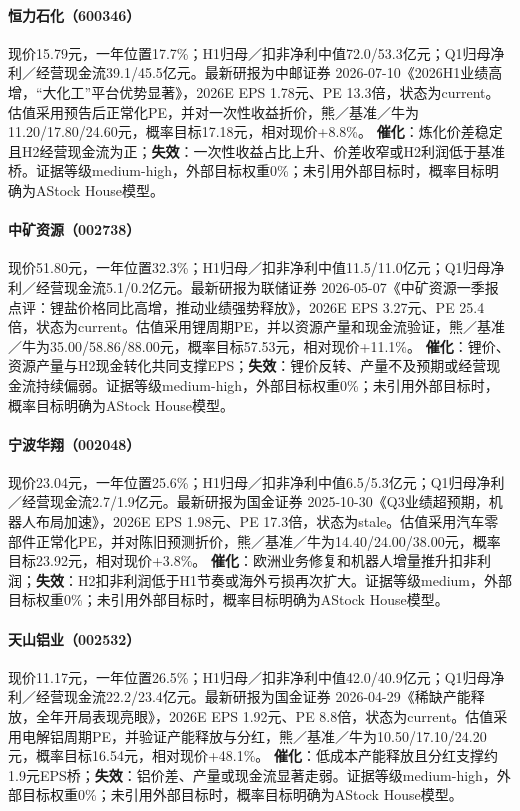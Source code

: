 \paragraph{恒力石化（600346）}
现价15.79元，一年位置17.7\%；H1归母／扣非净利中值72.0/53.3亿元；Q1归母净利／经营现金流39.1/45.5亿元。最新研报为中邮证券 2026-07-10《2026H1业绩高增，“大化工”平台优势显著》，2026E EPS 1.78元、PE 13.3倍，状态为current。估值采用预告后正常化PE，并对一次性收益折价，熊／基准／牛为11.20/17.80/24.60元，概率目标17.18元，相对现价+8.8\%。
\textbf{催化}：炼化价差稳定且H2经营现金流为正；\textbf{失效}：一次性收益占比上升、价差收窄或H2利润低于基准桥。证据等级medium-high，外部目标权重0\%；未引用外部目标时，概率目标明确为AStock House模型。

\paragraph{中矿资源（002738）}
现价51.80元，一年位置32.3\%；H1归母／扣非净利中值11.5/11.0亿元；Q1归母净利／经营现金流5.1/0.2亿元。最新研报为联储证券 2026-05-07《中矿资源一季报点评：锂盐价格同比高增，推动业绩强势释放》，2026E EPS 3.27元、PE 25.4倍，状态为current。估值采用锂周期PE，并以资源产量和现金流验证，熊／基准／牛为35.00/58.86/88.00元，概率目标57.53元，相对现价+11.1\%。
\textbf{催化}：锂价、资源产量与H2现金转化共同支撑EPS；\textbf{失效}：锂价反转、产量不及预期或经营现金流持续偏弱。证据等级medium-high，外部目标权重0\%；未引用外部目标时，概率目标明确为AStock House模型。

\paragraph{宁波华翔（002048）}
现价23.04元，一年位置25.6\%；H1归母／扣非净利中值6.5/5.3亿元；Q1归母净利／经营现金流2.7/1.9亿元。最新研报为国金证券 2025-10-30《Q3业绩超预期，机器人布局加速》，2026E EPS 1.98元、PE 17.3倍，状态为stale。估值采用汽车零部件正常化PE，并对陈旧预测折价，熊／基准／牛为14.40/24.00/38.00元，概率目标23.92元，相对现价+3.8\%。
\textbf{催化}：欧洲业务修复和机器人增量推升扣非利润；\textbf{失效}：H2扣非利润低于H1节奏或海外亏损再次扩大。证据等级medium，外部目标权重0\%；未引用外部目标时，概率目标明确为AStock House模型。

\paragraph{天山铝业（002532）}
现价11.17元，一年位置26.5\%；H1归母／扣非净利中值42.0/40.9亿元；Q1归母净利／经营现金流22.2/23.4亿元。最新研报为国金证券 2026-04-29《稀缺产能释放，全年开局表现亮眼》，2026E EPS 1.92元、PE 8.8倍，状态为current。估值采用电解铝周期PE，并验证产能释放与分红，熊／基准／牛为10.50/17.10/24.20元，概率目标16.54元，相对现价+48.1\%。
\textbf{催化}：低成本产能释放且分红支撑约1.9元EPS桥；\textbf{失效}：铝价差、产量或现金流显著走弱。证据等级medium-high，外部目标权重0\%；未引用外部目标时，概率目标明确为AStock House模型。

